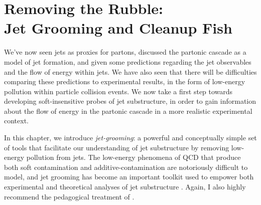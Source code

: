 \chapter[Removing the Rubble:\\\phantom{Chapter 4:|}Jet Grooming and Cleanup Fish]{Removing the Rubble:\hfill\\Jet Grooming and Cleanup Fish}

\label{chap:grooming}



We've now seen jets as proxies for partons, discussed the partonic cascade as a model of jet formation, and given some predictions regarding the jet observables and the flow of energy within jets.
%
We have also seen that there will be difficulties comparing these predictions to experimental results, in the form of low-energy pollution within particle collision events.
%
We now take a first step towards developing soft-insensitive probes of jet substructure, in order to gain information about the flow of energy in the partonic cascade in a more realistic experimental context.

In this chapter, we introduce \textit{\gls{jet-grooming}}:
%
a powerful and conceptually simple set of tools that facilitate our understanding of jet substructure by removing low-energy pollution from jets.
%
The low-energy phenomena of QCD that produce both soft contamination and \gls{additive-contamination} are notoriously difficult to model, and jet grooming has become an important toolkit used to empower both experimental and theoretical analyses of jet substructure
\cite{Krohn:2009th,Ellis:2009me,Larkoski:2014wba,Dasgupta:2013ihk,Dasgupta:2013via,Tseng:2013dva,Dasgupta:2016ktv,Thaler:2008ju,Thaler:2011gf,Hook:2011cq,Gallicchio:2011xq,Soper:2012pb,Gallicchio:2012ez,CMS-PAS-JME-09-001,CMS-PAS-EXO-09-002,CMS:2013kfa,ATL-PHYS-PUB-2009-081,ATL-PHYS-PUB-2010-008,Cui:2010km,ATLAS-CONF-2011-053,Chatrchyan:2013rla,Larkoski:2013eya,Dasgupta:2012hg,Backovic:2013bga,ATLAS-CONF-2013-084,Komiske:2018vkc,Komiske:2016rsd,Metodiev:2018ftz,Krohn:2012fg,MERINO:2013tta,Bhattacherjee:2016bpy,Macaluso:2018tck,Egan:2017ojy,Kasieczka:2017nvn,Pearkes:2017hku,Butter:2017cot,Catani:1992ua,Dokshitzer:1998kz,Dasgupta:2001sh,Banfi:2004yd,Banfi:2005gj,Ellis:2009su,Banfi:2010pa,Walsh:2011fz,Chien:2012ur,Li:2012bw,Jouttenus:2013hs,Hatta:2013iba,Larkoski:2014tva,Procura:2018zpn,Aaboud:2017aca,Frye:2016aiz, Almeida:2008yp,Larkoski:2017iuy,Larkoski:2017cqq,Thaler:2010tr,Abdesselam:2010pt,Katz:2010mr,Gallicchio:2010dq,Adams:2015hiv,Sirunyan:2017ezt,Moore:2018lsr,FerreiradeLima:2016gcz,Rubin:2010fc,Chatrchyan:2012sn,ATLAS:2019kwg,CMS-PAS-BTV-13-001,CMS-PAS-JME-13-006,Kribs:2009yh,Chen:2010wk,Hackstein:2010wk,Kim:2010uj,Almeida:2011aa,Pandolfi:2012ima,Vernieri:2014wfa,CMS-PAS-HIG-17-007,Procura:2014cba,ATL-PHYS-PUB-2019-027,Aad:2019vyi,ATLAS:2020gwe}.
%
Again, I also highly recommend the pedagogical treatment of .



